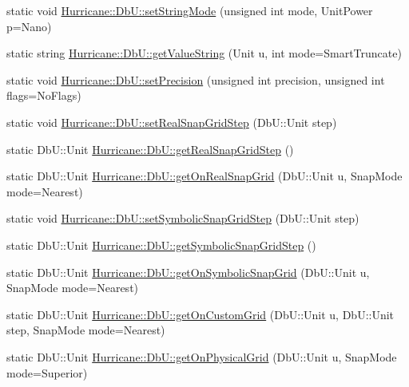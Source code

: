 \begin{DoxyCompactItemize}
static void \hyperlink{group__DbUGroup_ga89ab8f8326c54113336086663ecf1d25}{Hurricane\-::\-Db\-U\-::set\-String\-Mode} (unsigned int mode, Unit\-Power p=Nano)
\item 
static string \hyperlink{group__DbUGroup_gadc9c1a06b4296dbddcf711077113f4bd}{Hurricane\-::\-Db\-U\-::get\-Value\-String} (Unit u, int mode=Smart\-Truncate)
\item 
static void \hyperlink{group__DbUGroup_gace9a8644e7e80dcaed2a8a95deeb1622}{Hurricane\-::\-Db\-U\-::set\-Precision} (unsigned int precision, unsigned int flags=No\-Flags)
\item 
static void \hyperlink{group__DbUGroup_ga202cc3aa3364c2224647a29dde047fae}{Hurricane\-::\-Db\-U\-::set\-Real\-Snap\-Grid\-Step} (Db\-U\-::\-Unit step)
\item 
static Db\-U\-::\-Unit \hyperlink{group__DbUGroup_ga09e46fcca6aaca94851adfa196e10170}{Hurricane\-::\-Db\-U\-::get\-Real\-Snap\-Grid\-Step} ()
\item 
static Db\-U\-::\-Unit \hyperlink{group__DbUGroup_ga8746e486f153aa37ee469c1604eba5c0}{Hurricane\-::\-Db\-U\-::get\-On\-Real\-Snap\-Grid} (Db\-U\-::\-Unit u, Snap\-Mode mode=Nearest)
\item 
static void \hyperlink{group__DbUGroup_ga9ccd423c8f268ef54770f4663e6c9304}{Hurricane\-::\-Db\-U\-::set\-Symbolic\-Snap\-Grid\-Step} (Db\-U\-::\-Unit step)
\item 
static Db\-U\-::\-Unit \hyperlink{group__DbUGroup_ga687a9134729b107c42fb7f69596c4c3b}{Hurricane\-::\-Db\-U\-::get\-Symbolic\-Snap\-Grid\-Step} ()
\item 
static Db\-U\-::\-Unit \hyperlink{group__DbUGroup_gad1b0c0f3680093cf5a63d901312c925d}{Hurricane\-::\-Db\-U\-::get\-On\-Symbolic\-Snap\-Grid} (Db\-U\-::\-Unit u, Snap\-Mode mode=Nearest)
\item 
static Db\-U\-::\-Unit \hyperlink{group__DbUGroup_ga87323d9038656dceabffc37d45de408a}{Hurricane\-::\-Db\-U\-::get\-On\-Custom\-Grid} (Db\-U\-::\-Unit u, Db\-U\-::\-Unit step, Snap\-Mode mode=Nearest)
\item 
static Db\-U\-::\-Unit \hyperlink{group__DbUGroup_ga9419025221579f4277475c65655be3dc}{Hurricane\-::\-Db\-U\-::get\-On\-Physical\-Grid} (Db\-U\-::\-Unit u, Snap\-Mode mode=Superior)
\end{DoxyCompactItemize}

